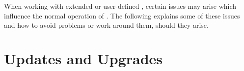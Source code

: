 When working with extended or user-defined \gdtesterclasses, certain
issues may arise which influence the normal operation of \app{}. The
following explains some of these issues and how to avoid problems or
work around them, should they arise.

\section{\app{} Updates and Upgrades}

